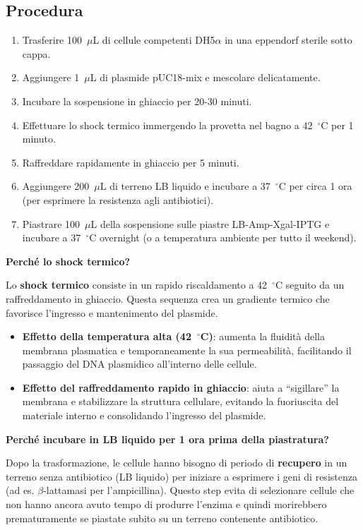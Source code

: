 \subsection{Procedura}
\begin{enumerate}\footnotesize
	\item Trasferire 100~$\mu$L di cellule competenti DH5$\alpha$ in una eppendorf sterile sotto cappa.
	\item Aggiungere 1~$\mu$L di plasmide pUC18-mix e mescolare delicatamente.
	\item Incubare la sospensione in ghiaccio per 20-30 minuti.
	\item Effettuare lo shock termico immergendo la provetta nel bagno a 42~$^\circ$C per 1 minuto.
	\item Raffreddare rapidamente in ghiaccio per 5 minuti.
	\item Aggiungere 200~$\mu$L di terreno LB liquido e incubare a 37~$^\circ$C per circa 1 ora (per esprimere la resistenza agli antibiotici).
	\item Piastrare 100~$\mu$L della sospensione sulle piastre LB-Amp-Xgal-IPTG e incubare a 37~$^\circ$C overnight (o a temperatura ambiente per tutto il weekend).
\end{enumerate}

\begin{percheBox}
  \textbf{Perché lo shock termico?}

  Lo \textbf{shock termico} consiste in un rapido riscaldamento a 42~$^\circ$C seguito da un raffreddamento in ghiaccio. Questa sequenza crea un gradiente termico che favorisce l’ingresso e mantenimento del plasmide.
  \begin{itemize}\footnotesize
    \item \textbf{Effetto della temperatura alta (42~$^\circ$C)}: aumenta la fluidità della membrana plasmatica e temporaneamente la sua permeabilità, facilitando il passaggio del DNA plasmidico all’interno delle cellule.
    \item \textbf{Effetto del raffreddamento rapido in ghiaccio}: aiuta a “sigillare” la membrana e stabilizzare la struttura cellulare, evitando la fuoriuscita del materiale interno e consolidando l’ingresso del plasmide.
  \end{itemize}
\end{percheBox}


\begin{percheBox}
  \textbf{Perché incubare in LB liquido per 1 ora prima della piastratura?}

  Dopo la trasformazione, le cellule hanno bisogno di periodo di \textbf{recupero} in un terreno senza antibiotico (LB liquido) per iniziare a esprimere i geni di resistenza (ad es. $\beta$-lattamasi per l’ampicillina). Questo step evita di selezionare cellule che non hanno ancora avuto tempo di produrre l’enzima e quindi morirebbero prematuramente se piastate subito su un terreno contenente antibiotico.
\end{percheBox}


